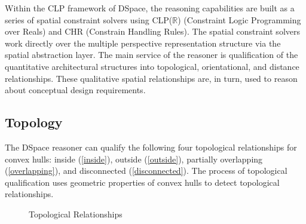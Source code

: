 \documentclass[12pt]{ucthesis}
\begin{document}
Within the CLP framework of DSpace, the reasoning capabilities are built as a series of spatial constraint solvers using CLP($\mathbb{R}$) (Constraint Logic Programming over Reals) and CHR (Constrain Handling Rules). The spatial constraint solvers work directly over the multiple perspective representation structure via the spatial abstraction layer. The main service of the reasoner is qualification of the quantitative architectural structures into topological, orientational, and distance relationships. These qualitative spatial relationships are, in turn, used to reason about conceptual design requirements.



\subsection{Topology}
The DSpace reasoner can qualify the following four topological relationships for convex hulls: inside (\ref{inside}), outside (\ref{outside}), partially overlapping (\ref{overlapping}), and disconnected (\ref{disconnected}). The process of topological qualification uses geometric properties of convex hulls to detect topological relationships. 

\begin{figure}[t]
 \centering
 \hspace{4 mm}
  \hspace{4 mm}
 \hspace{2 mm}
 \caption{Topological Relationships}
\label{topoloy}
\end{figure}
\end{document}
